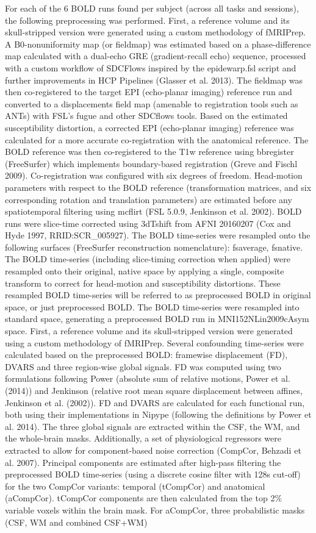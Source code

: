 For each of the 6 BOLD runs found per subject (across all tasks and sessions), the following preprocessing was performed. First, a reference volume and its skull-stripped version were generated using a custom methodology of fMRIPrep. A B0-nonuniformity map (or fieldmap) was estimated based on a phase-difference map calculated with a dual-echo GRE (gradient-recall echo) sequence, processed with a custom workflow of SDCFlows inspired by the epidewarp.fsl script and further improvements in HCP Pipelines (Glasser et al. 2013). The fieldmap was then co-registered to the target EPI (echo-planar imaging) reference run and converted to a displacements field map (amenable to registration tools such as ANTs) with FSL’s fugue and other SDCflows tools. Based on the estimated susceptibility distortion, a corrected EPI (echo-planar imaging) reference was calculated for a more accurate co-registration with the anatomical reference. The BOLD reference was then co-registered to the T1w reference using bbregister (FreeSurfer) which implements boundary-based registration (Greve and Fischl 2009). Co-registration was configured with six degrees of freedom. Head-motion parameters with respect to the BOLD reference (transformation matrices, and six corresponding rotation and translation parameters) are estimated before any spatiotemporal filtering using mcflirt (FSL 5.0.9, Jenkinson et al. 2002). BOLD runs were slice-time corrected using 3dTshift from AFNI 20160207 (Cox and Hyde 1997, RRID:SCR\_005927). The BOLD time-series were resampled onto the following surfaces (FreeSurfer reconstruction nomenclature): fsaverage, fsnative. The BOLD time-series (including slice-timing correction when applied) were resampled onto their original, native space by applying a single, composite transform to correct for head-motion and susceptibility distortions. These resampled BOLD time-series will be referred to as preprocessed BOLD in original space, or just preprocessed BOLD. The BOLD time-series were resampled into standard space, generating a preprocessed BOLD run in MNI152NLin2009cAsym space. First, a reference volume and its skull-stripped version were generated using a custom methodology of fMRIPrep. Several confounding time-series were calculated based on the preprocessed BOLD: framewise displacement (FD), DVARS and three region-wise global signals. FD was computed using two formulations following Power (absolute sum of relative motions, Power et al. (2014)) and Jenkinson (relative root mean square displacement between affines, Jenkinson et al. (2002)). FD and DVARS are calculated for each functional run, both using their implementations in Nipype (following the definitions by Power et al. 2014). The three global signals are extracted within the CSF, the WM, and the whole-brain masks. Additionally, a set of physiological regressors were extracted to allow for component-based noise correction (CompCor, Behzadi et al. 2007). Principal components are estimated after high-pass filtering the preprocessed BOLD time-series (using a discrete cosine filter with 128s cut-off) for the two CompCor variants: temporal (tCompCor) and anatomical (aCompCor). tCompCor components are then calculated from the top 2\% variable voxels within the brain mask. For aCompCor, three probabilistic masks (CSF, WM and combined CSF+WM) 